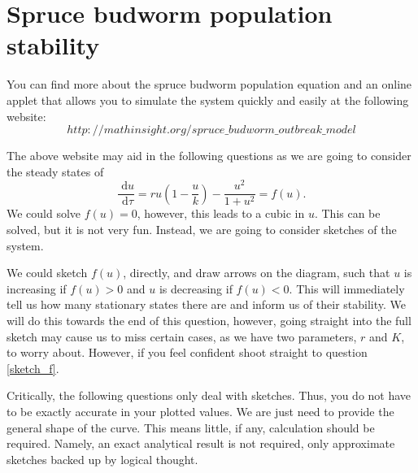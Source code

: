 \documentclass[]{article}
\newcommand{\bb}{\begin{equation}}
\newcommand{\ee}{\end{equation}}
\newcommand{\rd}{\text{ d}}
\renewcommand{\l}{\left(}
\renewcommand{\r}{\right)}
\begin{document}
\section{Spruce budworm population stability}
You can find more about the spruce budworm population equation and an online applet that allows you to simulate the system quickly and easily at the following website:
\bb
http://mathinsight.org/spruce\_budworm\_outbreak\_model
\ee

The above website may aid in the following questions as we are going to consider the steady states of
\bb
\frac{\rd u}{\rd \tau}=ru\l 1-\frac{u}{k}\r-\frac{u^2}{1+u^2}=f(u).\label{Spruce}
\ee
We could solve $f(u)=0$, however, this leads to a cubic in $u$. This can be solved, but it is not very fun. Instead, we are going to consider sketches of the system. 

We could sketch $f(u)$, directly, and draw arrows on the diagram, such that $u$ is increasing if $f(u)>0$ and $u$ is decreasing if $f(u)<0$. This will immediately tell us how many stationary states there are and inform us of their stability. We will do this towards the end of this question, however, going straight into the full sketch may cause us to miss certain cases, as we have two parameters, $r$ and $K$, to worry about. However, if you feel confident shoot straight to question \ref{sketch_f}.

Critically, the following questions only deal with sketches. Thus, you do not have to be exactly accurate in your plotted values. We are just need to provide the general shape of the curve. This means little, if any, calculation should be required. Namely, an exact analytical result is not required, only approximate sketches backed up by logical thought.
\end{document}

